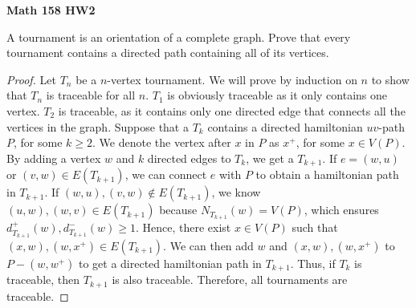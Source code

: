 \documentclass{article}
\newenvironment{problem}[2][Question]{\begin{trivlist}
\item[\hskip \labelsep {\bfseries #1}\hskip \labelsep {\bfseries #2.}]}{\end{trivlist}}
\begin{document}
 

\textbf{Math 158 HW2}

\begin{problem}{2.5.2}
    A tournament is an orientation of a complete graph. Prove that every tournament contains a directed path containing all of its vertices.
\end{problem}
\begin{proof}
    Let $T_n$ be a $n$-vertex tournament. We will prove by induction on $n$ to show that $T_n$ is traceable for all $n$. $T_1$ is obviously traceable as it only contains one vertex. $T_2$ is traceable, as it contains only one directed edge that connects all the vertices in the graph. Suppose that a $T_k$ contains a directed hamiltonian $uv$-path $P$, for some $k \geq 2$. We denote the vertex after $x$ in $P$ as $x^+$, for some $x \in V(P)$. By adding a vertex $w$ and $k$ directed edges to $T_k$, we get a $T_{k+1}$. If $e = (w, u)$ or $(v, w) \in E(T_{k+1})$, we can connect $e$ with $P$ to obtain a hamiltonian path in $T_{k+1}$. If $(w, u), (v, w) \notin E(T_{k+1})$, we know $(u, w), (w, v) \in E(T_{k+1})$ because $N_{T_{k+1}}(w) = V(P)$, which ensures $d_{T_{k+1}}^+(w), d_{T_{k+1}}^-(w) \geq 1$. Hence, there exist $x \in V(P)$ such that $(x, w), (w, x^+) \in E(T_{k+1})$. We can then add $w$ and $(x, w), (w, x^+)$ to $P - (w, w^+)$ to get a directed hamiltonian path in $T_{k+1}$. Thus, if $T_k$ is traceable, then $T_{k+1}$ is also traceable. Therefore, all tournaments are traceable.
\end{proof}

\newpage
\end{document}
